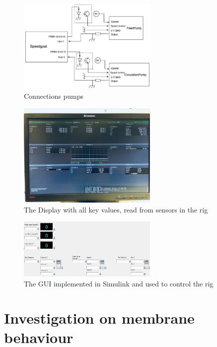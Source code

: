 \begin{figure}[H]
    \centering
    \includegraphics[width=0.6\textwidth]{PumpConn}
    \caption{Connections pumps}
    \label{fig:PumpConn}
\end{figure}
\begin{figure}[H]
    \centering
    \includegraphics[width=0.6\textwidth]{Display}
    \caption{The Display with all key values, read from sensors in the rig}
    \label{fig:display}
\end{figure}
\begin{figure}[H]
    \centering
    \includegraphics[width=0.6\textwidth]{GUI}
    \caption{The GUI implemented in Simulink and used to control the rig}
    \label{fig:gui}
\end{figure}


\newpage


\section{Investigation on membrane behaviour}

